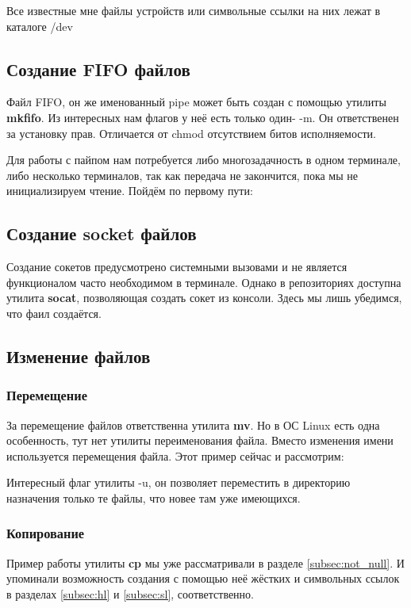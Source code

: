 \documentclass[a4paper]{article}
\begin{document}
Все известные мне файлы устройств или символьные ссылки на них лежат в каталоге /dev

\subsection{Создание FIFO файлов}
Файл FIFO, он же именованный pipe может быть создан с помощью утилиты \textbf{mkfifo}. Из интересных нам флагов у неё есть только один- -m. Он ответственен за установку прав. Отличается от chmod отсутствием битов исполняемости.

Для работы с пайпом нам потребуется либо многозадачность в одном терминале, либо несколько терминалов, так как передача не закончится, пока мы не инициализируем чтение. Пойдём по первому пути:



\subsection{Создание socket файлов}
Создание сокетов предусмотрено системными вызовами и не является функционалом часто необходимом в терминале. Однако в репозиториях доступна утилита \textbf{socat}, позволяющая создать сокет из консоли. Здесь мы лишь убедимся, что фаил создаётся.


\subsection{ Изменение файлов}
\subsubsection{ Перемещение}
За перемещение файлов ответственна утилита \textbf{mv}. Но в ОС Linux есть одна особенность, тут нет утилиты переименования файла. Вместо изменения имени используется перемещения файла. Этот пример сейчас и рассмотрим:

Интересный флаг утилиты -u, он позволяет переместить в директорию назначения только те файлы, что новее там уже имеющихся.
\subsubsection{ Копирование}
Пример работы утилиты \textbf{cp} мы уже рассматривали в разделе \ref{subsec:not_null}. И упоминали возможность создания с помощью неё жёстких и символьных ссылок в разделах \ref{subsec:hl} и \ref{subsec:sl}, соответственно.
\end{document}
